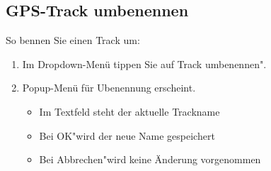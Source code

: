 \documentclass{article}
\begin{document}
\subsection{GPS-Track umbenennen}
	So bennen Sie einen Track um:
	\begin{enumerate}
		\item Im Dropdown-Menü tippen Sie auf \glqq Track umbenennen".
		\item Popup-Menü für Ubenennung erscheint.
		\begin{itemize}
			\item Im Textfeld steht der aktuelle Trackname
			\item Bei \glqq OK"\space wird der neue Name gespeichert
			\item Bei \glqq Abbrechen"\space wird keine Änderung vorgenommen
		\end{itemize}
	\end{enumerate}
\end{document}
